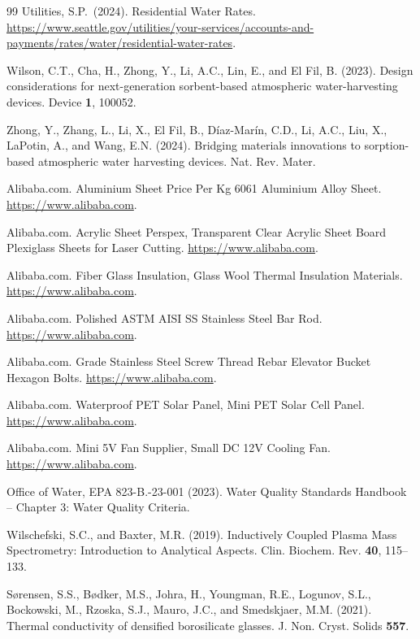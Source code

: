 \documentclass[11pt]{article}
\begin{document}
\begin{thebibliography}{99}
 Utilities, S.P.\ (2024). Residential Water Rates. \url{https://www.seattle.gov/utilities/your-services/accounts-and-payments/rates/water/residential-water-rates}.

 Wilson, C.T., Cha, H., Zhong, Y., Li, A.C., Lin, E., and El Fil, B. (2023). Design considerations for next-generation sorbent-based atmospheric water-harvesting devices. Device \textbf{1}, 100052.

 Zhong, Y., Zhang, L., Li, X., El Fil, B., D{\'i}az-Mar{\'i}n, C.D., Li, A.C., Liu, X., LaPotin, A., and Wang, E.N. (2024). Bridging materials innovations to sorption-based atmospheric water harvesting devices. Nat. Rev. Mater.

 Alibaba.com. Aluminium Sheet Price Per Kg 6061 Aluminium Alloy Sheet. \url{https://www.alibaba.com}.

 Alibaba.com. Acrylic Sheet Perspex, Transparent Clear Acrylic Sheet Board Plexiglass Sheets for Laser Cutting. \url{https://www.alibaba.com}.

 Alibaba.com. Fiber Glass Insulation, Glass Wool Thermal Insulation Materials. \url{https://www.alibaba.com}.

 Alibaba.com. Polished ASTM AISI SS Stainless Steel Bar Rod. \url{https://www.alibaba.com}.

 Alibaba.com. Grade Stainless Steel Screw Thread Rebar Elevator Bucket Hexagon Bolts. \url{https://www.alibaba.com}.

 Alibaba.com. Waterproof PET Solar Panel, Mini PET Solar Cell Panel. \url{https://www.alibaba.com}.

 Alibaba.com. Mini 5V Fan Supplier, Small DC 12V Cooling Fan. \url{https://www.alibaba.com}.

 Office of Water, EPA 823-B.-23-001 (2023). Water Quality Standards Handbook -- Chapter 3: Water Quality Criteria.

 Wilschefski, S.C., and Baxter, M.R. (2019). Inductively Coupled Plasma Mass Spectrometry: Introduction to Analytical Aspects. Clin. Biochem. Rev. \textbf{40}, 115--133.

 S{\o}rensen, S.S., B{\o}dker, M.S., Johra, H., Youngman, R.E., Logunov, S.L., Bockowski, M., Rzoska, S.J., Mauro, J.C., and Smedskjaer, M.M. (2021). Thermal conductivity of densified borosilicate glasses. J. Non. Cryst. Solids \textbf{557}.


\end{thebibliography}
\end{document}
